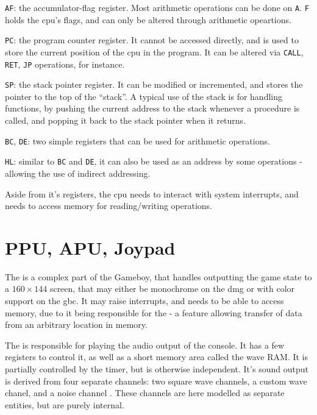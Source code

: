 \documentclass[11pt]{report}
\begin{document}
\begin{compactitem}
	\item \texttt{AF}: the accumulator-flag register. Most arithmetic operations can be done on \texttt{A}. \texttt{F} holds the \gls{cpu}'s flags, and can only be altered through arithmetic opeartions.
	\item \texttt{PC}: the program counter register. It cannot be accessed directly, and is used to store the current position of the \gls{cpu} in the program. It can be altered via \texttt{CALL}, \texttt{RET}, \texttt{JP} operations, for instance.
	\item \texttt{SP}: the stack pointer register. It can be modified or incremented, and stores the pointer to the top of the ``stack''. A typical use of the stack is for handling functions, by pushing the current address to the stack whenever a procedure is called, and popping it back to the stack pointer when it returns.
	\item \texttt{BC}, \texttt{DE}: two simple registers that can be used for arithmetic operations.
	\item \texttt{HL}: similar to \texttt{BC} and \texttt{DE}, it can also be used as an address by some operations - allowing the use of indirect addressing.
\end{compactitem}

Aside from it's registers, the \gls{cpu} needs to interact with system interrupts, and needs to access memory for reading/writing operations.

\section{PPU, APU, Joypad}

The  is a complex part of the Gameboy, that handles outputting the game state to a $160 \times 144$ screen, that may either be monochrome on the \gls{dmg} or with color support on the \gls{gbc}. It may raise interrupts, and needs to be able to access memory, due to it being responsible for the  - a feature allowing transfer of data from an arbitrary location in memory.

The  is responsible for playing the audio output of the console. It has a few registers to control it, as well as a short memory area called the wave RAM. It is partially controlled by the timer, but is otherwise independent. It's sound output is derived from four separate channels: two square wave channels, a custom wave chanel, and a noise channel \cite[Audio]{pandoc}. These channels are here modelled as separate entities, but are purely internal.
\end{document}
